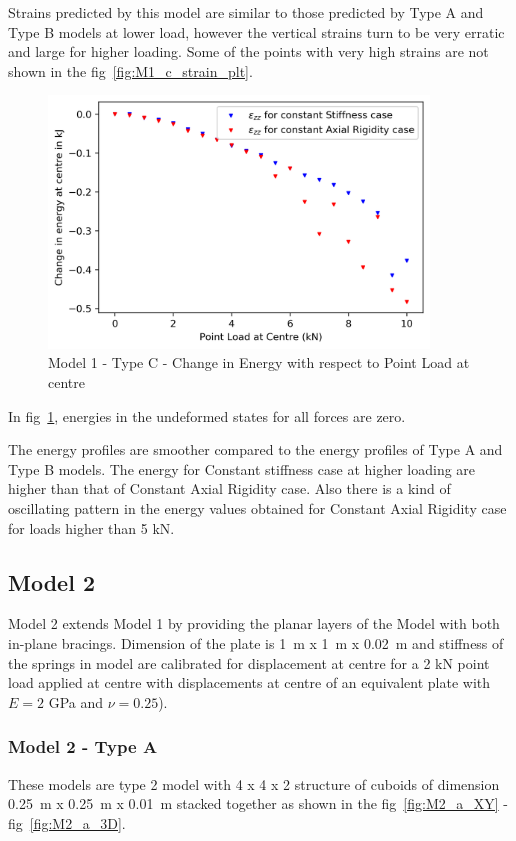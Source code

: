 Strains predicted by this model are similar to those predicted by Type A and Type B models at lower load, however the vertical strains turn to be very erratic and large for higher loading. Some of the points with very high strains are not shown in the fig~\ref{fig:M1_c_strain_plt}. 

\begin{figure}[!htbp]
    \centering
    \includegraphics[width = 0.9\textwidth]{Figures/M1_c_energy.png}
    \caption{Model 1 - Type C - Change in Energy with respect to Point Load at centre}
    \label{fig:M1_c_energy}
\end{figure}

In fig~\ref{fig:M1_c_energy}, energies in the undeformed states for all forces are zero.

The energy profiles are smoother compared to the energy profiles of Type A and Type B models. The energy for Constant stiffness case at higher loading are higher than that of Constant Axial Rigidity case. Also there is a kind of oscillating pattern in the energy values obtained for Constant Axial Rigidity case for loads higher than 5 kN. 

\newpage
\subsection{Model 2}
Model 2 extends Model 1 by providing the planar layers of the Model with both in-plane bracings. Dimension of the plate is 1~m x 1~m x 0.02~m and stiffness of the springs in model are calibrated for displacement at centre for a 2 kN point load applied at centre with displacements at centre of an equivalent plate with $E = 2$ GPa and $\nu = 0.25$).

\subsubsection{Model 2 - Type A}
These models are type 2 model with 4 x 4 x 2 structure of cuboids of dimension 0.25~m x 0.25~m x 0.01~m stacked together as shown in the fig~\ref{fig:M2_a_XY} - fig~\ref{fig:M2_a_3D}.

